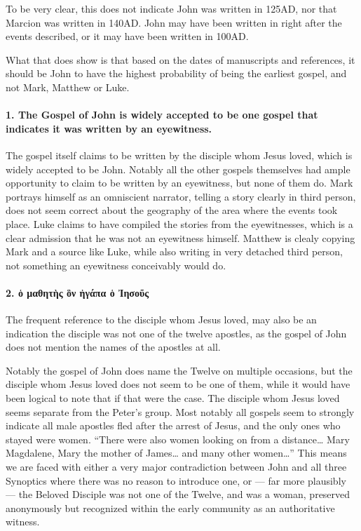 To be very clear, this does not indicate John was written in 125AD, nor that Marcion was written in 140AD.
John may have been written in right after the events described, or it may have been written in 100AD.

What that does show is that based on the dates of manuscripts and references, it should be John to have the highest probability of being the earliest gospel, and not Mark, Matthew or Luke.

\paragraph{1.
The Gospel of John is widely accepted to be one gospel that indicates it was written by an eyewitness.}\label{par:the-gospel-of-john-is-widely-accepted-to-be-one-gospel-that-indicates-it-was-written-by-an-eyewitness.}

The gospel itself claims to be written by the disciple whom Jesus loved, which is widely accepted to be John.
Notably all the other gospels themselves had ample opportunity to claim to be written by an eyewitness, but none of them do.
Mark portrays himself as an omniscient narrator, telling a story clearly in third person, does not seem correct about the geography of the area where the events took place.
Luke claims to have compiled the stories from the eyewitnesses, which is a clear admission that he was not an eyewitness himself.
Matthew is clealy copying Mark and a source like Luke, while also writing in very detached third person, not something an eyewitness conceivably would do.

\paragraph{2.
ὁ μαθητὴς ὃν ἠγάπα ὁ Ἰησοῦς}\label{par:ux1f41-ux3bcux3b1ux3b8ux3b7ux3c4ux1f74ux3c2-ux1f43ux3bd-ux1f20ux3b3ux3acux3c0ux3b1-ux1f41-ux1f30ux3b7ux3c3ux3bfux1fe6ux3c2}

The frequent reference to the disciple whom Jesus loved, may also be an indication the disciple was not one of the twelve apostles, as the gospel of John does not mention the names of the apostles at all.

Notably the gospel of John does name the Twelve on multiple occasions, but the disciple whom Jesus loved does not seem to be one of them, while it would have been logical to note that if that were the case.
The disciple whom Jesus loved seems separate from the Peter's group.
Most notably all gospels seem to strongly indicate all male apostles fled after the arrest of Jesus, and the only ones who stayed were women.
``There were also women looking on from a distance\ldots{} Mary Magdalene, Mary the mother of James\ldots{} and many other women\ldots'' This means we are faced with either a very major contradiction between John and all three Synoptics where there was no reason to introduce one, or --- far more plausibly --- the Beloved Disciple was not one of the Twelve, and was a woman, preserved anonymously but recognized within the early community as an authoritative witness.

